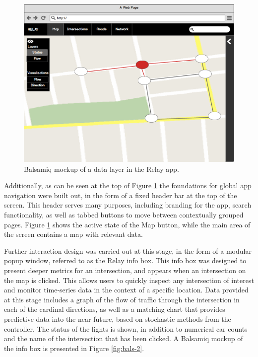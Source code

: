 \documentclass{report}
\begin{document}
\begin{figure}[htbp!]
  \begin{centering}
    \includegraphics[scale=0.65]{figures/bals-1.png}
    \caption{Balsamiq mockup of a data layer in the Relay app.}
    \label{fig:bals-1}
  \end{centering}
\end{figure}

Additionally, as can be seen at the top of Figure \ref{fig:bals-1} the foundations for global app navigation were built out, in the form of a fixed header bar at the top of the screen.
This header serves many purposes, including branding for the app, search functionality, as well as tabbed buttons to move between contextually grouped pages.
Figure \ref{fig:bals-1} shows the active state of the Map button, while the main area of the screen contains a map with relevant data.

Further interaction design was carried out at this stage, in the form of a modular popup window, referred to as the Relay info box.
This info box was designed to present deeper metrics for an intersection, and appears when an intersection on the map is clicked.
This allows users to quickly inspect any intersection of interest and monitor time-series data in the context of a specific location.
Data provided at this stage includes a graph of the flow of traffic through the intersection in each of the cardinal directions, as well as a matching chart that provides predictive data into the near future, based on stochastic methods from the controller.
The status of the lights is shown, in addition to numerical car counts and the name of the intersection that has been clicked.
A Balsamiq mockup of the info box is presented in Figure \ref{fig:bals-2}. \\
\end{document}
